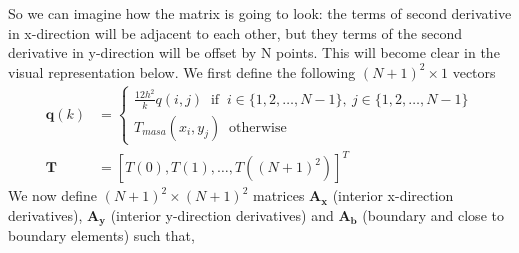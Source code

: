 \documentclass[12 pt, final]{article}
\begin{document}
\begin{itemize}
\begin{itemize}
\begin{enumerate}
                So we can imagine how the matrix is going to look: the terms of second derivative in x-direction will be adjacent to each other, but they terms of the second derivative in y-direction will be offset by N points. This will become clear in the visual representation below.
                We first define the following $(N+1)^2 \times 1$ vectors
                \begin{align*}
                    \mathbf{q}(k) &= \begin{cases}
                    \frac{12 h^2}{k} q(i,j) \:\text{ if }\: i \in \{1,2,\hdots,N-1\},\: j \in \{1,2,\hdots,N-1\}\\
                     T_{masa}(x_i,y_j) \:\text{ otherwise }
                    \end{cases}\\
                    \mathbf{T} &= [T(0) ,T(1),\hdots, T((N+1)^2)]^T
                \end{align*}
            We now define $(N+1)^2\times(N+1)^2$ matrices $\mathbf{A_x}$ (interior x-direction derivatives), $\mathbf{A_y}$ (interior y-direction derivatives) and $\mathbf{A_b}$ (boundary and close to boundary elements) such that,
            

\end{enumerate}
\end{itemize}
\end{itemize}
\end{document}
